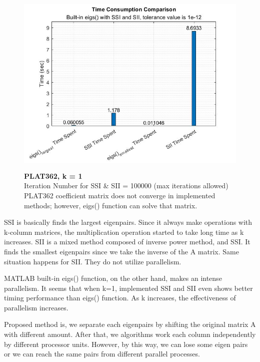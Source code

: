 \documentclass[12pt]{article}
\begin{document}
\begin{figure}[H]
	\centerline{\includegraphics[height=9cm, width=12cm]{plotplat.jpg}}
	\caption{\textbf{PLAT362, k = 1} \\ Iteration Number for SSI \& SII = 100000 (max iterations allowed) \\ PLAT362 coefficient matrix does not converge in implemented methods; however, eigs() function can solve that matrix.}
	\label{fig11}
\end{figure}

\hspace{1cm}


\par \quad SSI is basically finds the largest eigenpairs. Since it always make operations with k-column matrices, the multiplication operation started to take long time as k increases. SII is a mixed method composed of inverse power method, and SSI. It finds the smallest eigenpairs since we take the inverse of the A matrix. Same situation happens for SII. They do not utilize parallelism.
\par \quad MATLAB built-in eigs() function, on the other hand, makes an intense parallelism. It seems that when k=1, implemented SSI and SII even shows better timing performance than eigs() function. As k increases, the effectiveness of parallelism increases. 
\par \quad Proposed method is, we separate each eigenpairs by shifting the original matrix A with different amount. After that, we algorithms work each column independently by different processor units. However, by this way, we can lose some eigen pairs or we can reach the same pairs from different parallel processes.
\end{document}
